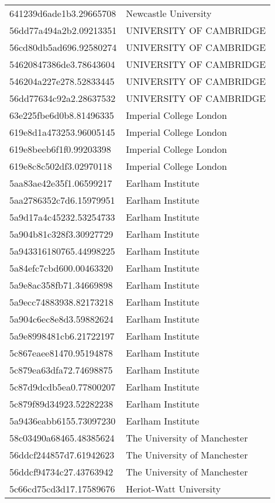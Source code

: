 \begin{tabular}{ll}
641239d6ade1b3.29665708 & Newcastle University \\
56dd77a494a2b2.09213351 & UNIVERSITY OF CAMBRIDGE \\
56cd80db5ad696.92580274 & UNIVERSITY OF CAMBRIDGE \\
54620847386de3.78643604 & UNIVERSITY OF CAMBRIDGE \\
546204a227e278.52833445 & UNIVERSITY OF CAMBRIDGE \\
56dd77634c92a2.28637532 & UNIVERSITY OF CAMBRIDGE \\
63e225fbe6d0b8.81496335 & Imperial College London \\
619e8d1a473253.96005145 & Imperial College London \\
619e8beeb6f1f0.99203398 & Imperial College London \\
619e8c8c502df3.02970118 & Imperial College London \\
5aa83ae42e35f1.06599217 & Earlham Institute \\
5aa2786352c7d6.15979951 & Earlham Institute \\
5a9d17a4c45232.53254733 & Earlham Institute \\
5a904b81c328f3.30927729 & Earlham Institute \\
5a943316180765.44998225 & Earlham Institute \\
5a84efc7cbd600.00463320 & Earlham Institute \\
5a9e8ac358fb71.34669898 & Earlham Institute \\
5a9ecc74883938.82173218 & Earlham Institute \\
5a904c6ec8e8d3.59882624 & Earlham Institute \\
5a9e8998481cb6.21722197 & Earlham Institute \\
5c867eaee81470.95194878 & Earlham Institute \\
5c879ea63dfa72.74698875 & Earlham Institute \\
5c87d9dcdb5ea0.77800207 & Earlham Institute \\
5c879f89d34923.52282238 & Earlham Institute \\
5a9436eabb6155.73097230 & Earlham Institute \\
58c03490a68465.48385624 & The University of Manchester \\
56ddcf244857d7.61942623 & The University of Manchester \\
56ddcf94734c27.43763942 & The University of Manchester \\
5c66cd75cd3d17.17589676 & Heriot-Watt University \\

\end{tabular}
